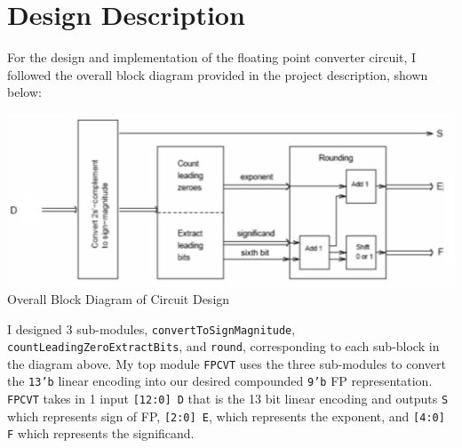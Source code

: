 \documentclass{article}
\begin{document}
\section{Design Description}
For the design and implementation of the floating point converter circuit, I followed the overall block diagram provided in the project description, shown below:
\begin{center}
    \includegraphics[scale=0.6]{overall_block_diagram.png} \\
    \caption{Overall Block Diagram of Circuit Design}
\end{center}
I designed 3 sub-modules, \texttt{convertToSignMagnitude}, \texttt{countLeadingZeroExtractBits}, and \texttt{round}, corresponding to each sub-block in the diagram above. My top module \texttt{FPCVT} uses the three sub-modules to convert the \texttt{13'b} linear encoding into our desired compounded \texttt{9'b} FP representation. \texttt{FPCVT} takes in 1 input \texttt{[12:0] D} that is the 13 bit linear encoding and outputs \texttt{S} which represents sign of FP, \texttt{[2:0] E}, which represents the exponent, and \texttt{[4:0] F} which represents the significand.
\renewcommand{\theenumi}{\alph{enumi}}
\end{document}

